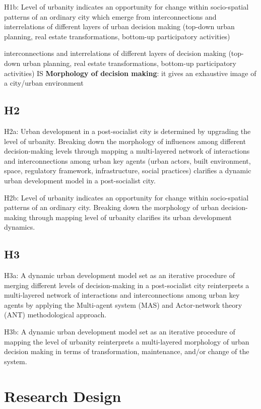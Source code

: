 \documentclass[11pt]{report}
\begin{document}
H1b: Level of urbanity indicates an opportunity for change within socio-spatial patterns of an ordinary city which emerge from interconnections and interrelations  of  different  layers  of urban decision  making (top-down urban planning, real estate transformations, bottom-up participatory activities)

interconnections and interrelations  of  different  layers  of  decision  making (top-down urban planning, real estate transformations, bottom-up participatory activities) IS \textbf{Morphology of decision making}: it gives an exhaustive image of a city/urban environment 

\subsection{H2}

H2a:  Urban  development  in  a  post-socialist  city  is  determined  by  upgrading  the  level  of  urbanity.  Breaking  down  the 
morphology of influences among different decision-making levels through mapping a multi-layered network of interactions 
and interconnections among urban key agents (urban actors, built environment, space, regulatory framework, infrastructure, 
social practices) clarifies a dynamic urban development model in a post-socialist city.

H2b: Level of urbanity indicates an opportunity for change within socio-spatial patterns of an ordinary city.
Breaking  down  the morphology of urban
decision-making through mapping level of urbanity clarifies its urban development dynamics.

\subsection{H3}

H3a: A dynamic urban development model set as an iterative procedure of merging different levels of decision-making in a post-socialist  city  reinterprets  a  multi-layered  network  of  interactions  and  interconnections  among  urban  key  agents  by applying the Multi-agent system (MAS) and Actor-network theory (ANT) methodological approach.

H3b: A dynamic urban development model set as an iterative procedure of mapping the level of urbanity reinterprets a  multi-layered  morphology  of urban decision making
in terms of transformation, maintenance, and/or change of the system.

\section{Research Design}
\end{document}
